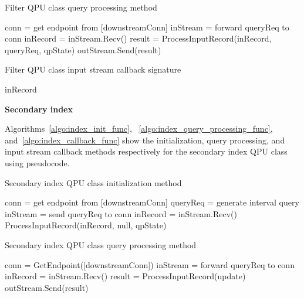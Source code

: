 \begin{algorithm}
\caption{Filter QPU class query processing method}
\label{algo:filter_query_processing_func}
\begin{algorithmic}
\State conn = get endpoint from [downstreamConn] 
\State inStream = forward queryReq to conn
\State inRecord = inStream.Recv()
\State result = ProcessInputRecord(inRecord, queryReq, qpState)
\State outStream.Send(result)
\EndIf
\EndWhile
\EndFunction
\end{algorithmic}
\end{algorithm}

\begin{algorithm}
\caption{Filter QPU class input stream callback signature}
\label{algo:filter_algorithm_func}
\begin{algorithmic}
\State \Return inRecord
\Else
\State \Return []
\EndIf
\EndFunction
\end{algorithmic}
\end{algorithm}


\bigskip
\noindent
\textbf{Secondary index}

Algorithms~\ref{algo:index_init_func}, ~\ref{algo:index_query_processing_func}, and~\ref{algo:index_callback_func}
show the initialization, query processing, and input stream callback methods respectively for the secondary index QPU
class using pseudocode.

\begin{algorithm}
\caption{Secondary index QPU class initialization method}
\label{algo:index_init_func}
\begin{algorithmic}
\State conn = get endpoint from [downstreamConn] 
\State queryReq = generate interval query
\State inStream = send queryReq to conn
\State inRecord = inStream.Recv()
\State ProcessInputRecord(inRecord, null, qpState)
\EndWhile
\EndFunction
\end{algorithmic}
\end{algorithm}

\begin{algorithm}
\caption{Secondary index QPU class query processing method}
\label{algo:index_query_processing_func}
\begin{algorithmic}
\State conn = GetEndpoint([downstreamConn]) 
\State inStream = forward queryReq to conn
\State inRecord = inStream.Recv()
\State result = ProcessInputRecord(update)
\State outStream.Send(result)
\EndIf
\EndWhile
\EndFunction
\end{algorithmic}
\end{algorithm}

